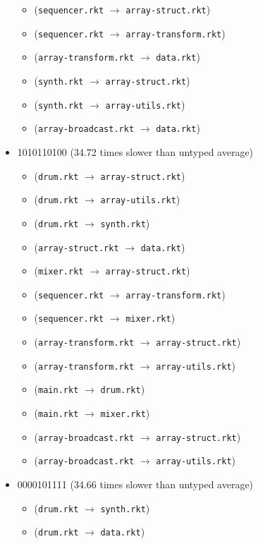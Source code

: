 \documentclass{article}
\newcommand{\mono}[1]{\texttt{#1}}
\begin{document}
\begin{itemize}
\begin{itemize}
  \item (\mono{sequencer.rkt} $\rightarrow$ \mono{array-struct.rkt})
  \item (\mono{sequencer.rkt} $\rightarrow$ \mono{array-transform.rkt})
  \item (\mono{array-transform.rkt} $\rightarrow$ \mono{data.rkt})
  \item (\mono{synth.rkt} $\rightarrow$ \mono{array-struct.rkt})
  \item (\mono{synth.rkt} $\rightarrow$ \mono{array-utils.rkt})
  \item (\mono{array-broadcast.rkt} $\rightarrow$ \mono{data.rkt})
  \end{itemize}
\item 1010110100 (34.72 times slower than untyped average)
  \begin{itemize}
  \item (\mono{drum.rkt} $\rightarrow$ \mono{array-struct.rkt})
  \item (\mono{drum.rkt} $\rightarrow$ \mono{array-utils.rkt})
  \item (\mono{drum.rkt} $\rightarrow$ \mono{synth.rkt})
  \item (\mono{array-struct.rkt} $\rightarrow$ \mono{data.rkt})
  \item (\mono{mixer.rkt} $\rightarrow$ \mono{array-struct.rkt})
  \item (\mono{sequencer.rkt} $\rightarrow$ \mono{array-transform.rkt})
  \item (\mono{sequencer.rkt} $\rightarrow$ \mono{mixer.rkt})
  \item (\mono{array-transform.rkt} $\rightarrow$ \mono{array-struct.rkt})
  \item (\mono{array-transform.rkt} $\rightarrow$ \mono{array-utils.rkt})
  \item (\mono{main.rkt} $\rightarrow$ \mono{drum.rkt})
  \item (\mono{main.rkt} $\rightarrow$ \mono{mixer.rkt})
  \item (\mono{array-broadcast.rkt} $\rightarrow$ \mono{array-struct.rkt})
  \item (\mono{array-broadcast.rkt} $\rightarrow$ \mono{array-utils.rkt})
  \end{itemize}
\item 0000101111 (34.66 times slower than untyped average)
  \begin{itemize}
  \item (\mono{drum.rkt} $\rightarrow$ \mono{synth.rkt})
  \item (\mono{drum.rkt} $\rightarrow$ \mono{data.rkt})

\end{itemize}
\end{itemize}
\end{document}
